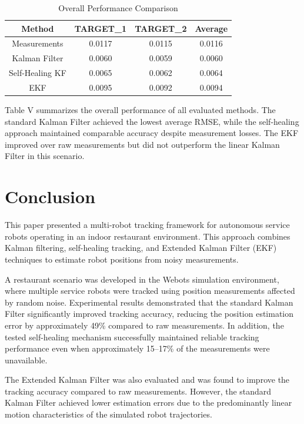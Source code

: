 \documentclass[conference]{IEEEtran}
\begin{document}
\begin{table}[h]
\centering
\caption{Overall Performance Comparison}
\label{tab:overall_comparison}
\begin{tabular}{|c|c|c|c|}
\hline
Method & TARGET\_1 & TARGET\_2 & Average \\
\hline
Measurements & 0.0117 & 0.0115 & 0.0116 \\
Kalman Filter & 0.0060 & 0.0059 & 0.0060 \\
Self-Healing KF & 0.0065 & 0.0062 & 0.0064 \\
EKF & 0.0095 & 0.0092 & 0.0094 \\
\hline
\end{tabular}
\end{table}

Table V summarizes the overall performance of all evaluated methods. The standard Kalman Filter achieved the lowest average RMSE, while the self-healing approach maintained comparable accuracy despite measurement losses. The EKF improved over raw measurements but did not outperform the linear Kalman Filter in this scenario.

\section{Conclusion}

This paper presented a multi-robot tracking framework for autonomous service robots operating in an indoor restaurant environment. This approach combines Kalman filtering, self-healing tracking, and Extended Kalman Filter (EKF) techniques to estimate robot positions from noisy measurements.

A restaurant scenario was developed in the Webots simulation environment, where multiple service robots were tracked using position measurements affected by random noise. Experimental results demonstrated that the standard Kalman Filter significantly improved tracking accuracy, reducing the position estimation error by approximately 49\% compared to raw measurements. In addition, the tested self-healing mechanism successfully maintained reliable tracking performance even when approximately 15--17\% of the measurements were unavailable.

The Extended Kalman Filter was also evaluated and was found to improve the tracking accuracy compared to raw measurements. However, the standard Kalman Filter achieved lower estimation errors due to the predominantly linear motion characteristics of the simulated robot trajectories.
\end{document}
